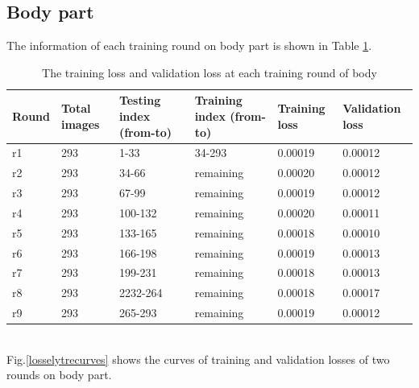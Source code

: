 \documentclass[12pt,a4paper]{article}
\begin{document}
\subsection{Body part}
The information of each training round on body part is shown in Table \ref{bodyloss}.
\begin{table}[h!]
	\centering
	\begin{tabular}{l p{2cm} p{2.4cm} p{2.6cm} p{2.2cm} p{2.2cm}}
	Round & Total images & Testing index (from-to) & Training index (from-to) & Training loss & Validation loss \\ \hline
	r1 & 293 & 1-33 & 34-293 & 0.00019 & 0.00012 \\ \hline
	r2 & 293 & 34-66 & remaining & 0.00020 & 0.00012 \\ \hline
	r3 & 293 & 67-99 & remaining & 0.00019 & 0.00012 \\ \hline
	r4 & 293 & 100-132 & remaining & 0.00020 & 0.00011 \\ \hline
	r5 & 293 & 133-165 & remaining & 0.00018 & 0.00010 \\ \hline
	r6 & 293 & 166-198 & remaining & 0.00019 & 0.00013 \\ \hline
	r7 & 293 & 199-231 & remaining & 0.00018 & 0.00013 \\ \hline
	r8 & 293 & 2232-264 & remaining & 0.00018 & 0.00017 \\ \hline
	r9 & 293 & 265-293 & remaining & 0.00019 & 0.00012 \\ \hline	
	\end{tabular}
	\caption{The training loss and validation loss at each training round of body}
	\label{bodyloss}
\end{table}~\\
Fig.\ref{losselytrecurves} shows the curves of training and validation losses of two rounds on body part.
\end{document}
